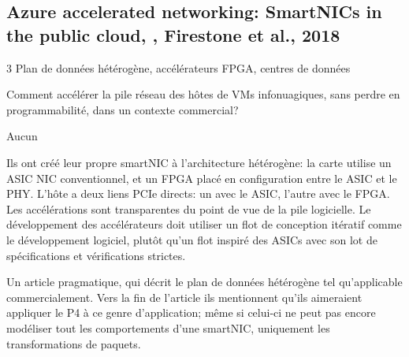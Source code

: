 
\subsection{Azure accelerated networking: SmartNICs in the public cloud, \cite{firestone_azure_2018}, Firestone et al., 2018}

 3
 Plan de données hétérogène, accélérateurs FPGA, centres de données

 Comment accélérer la pile réseau des hôtes de VMs infonuagiques, sans perdre en programmabilité, dans un contexte commercial?

 Aucun

 Ils ont créé leur propre smartNIC à l'architecture hétérogène: la carte utilise un ASIC NIC conventionnel, et un FPGA placé en configuration  entre le ASIC et le PHY. L'hôte a deux liens PCIe directs: un avec le ASIC, l'autre avec le FPGA. Les accélérations sont transparentes du point de vue de la pile logicielle. Le développement des accélérateurs doit utiliser un flot de conception itératif comme le développement logiciel, plutôt qu'un flot inspiré des ASICs avec son lot de spécifications et vérifications strictes.


 Un article pragmatique, qui décrit le plan de données hétérogène tel qu'applicable commercialement. Vers la fin de l'article ils mentionnent qu'ils aimeraient appliquer le P4 à ce genre d'application; même si celui-ci ne peut pas encore modéliser tout les comportements d'une smartNIC, uniquement les transformations de paquets.

\clearpage
